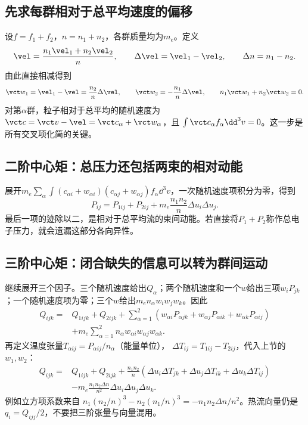 \subsection{先求每群相对于总平均速度的偏移}
设$f=f_1+f_2$，$n=n_1+n_2$，各群质量均为$m_e$。定义
\begin{equation}
 \vel=\frac{n_1\vel_1+n_2\vel_2}{n},\qquad
 \Delta\vel=\vel_1-\vel_2,\qquad \Delta n=n_1-n_2.
\end{equation}
由此直接相减得到
\begin{equation}
 \vct w_1=\vel_1-\vel=\frac{n_2}{n}\Delta\vel,
 \qquad \vct w_2=-\frac{n_1}{n}\Delta\vel,
 \qquad n_1\vct w_1+n_2\vct w_2=0.
\end{equation}
对第$\alpha$群，粒子相对于总平均的随机速度为
$\vct c=\vct v-\vel=\vct c_\alpha+\vct w_\alpha$，且
$\int\vct c_\alpha f_\alpha\dd^3v=0$。这一步是所有交叉项化简的关键。

\subsection{二阶中心矩：总压力还包括两束的相对动能}
展开$m_e\sum_\alpha\int(c_{\alpha i}+w_{\alpha i})
(c_{\alpha j}+w_{\alpha j})f_\alpha\dd^3v$，一次随机速度项积分为零，得到
\begin{equation}
 P_{ij}=P_{1ij}+P_{2ij}
 +m_e\frac{n_1n_2}{n}\Delta u_i\Delta u_j.
 \label{eq:mixture_pressure}
\end{equation}
最后一项的迹除以二，是相对于总平均流的束间动能。若直接将$P_1+P_2$称作总电子压力，就会遗漏这部分各向异性。

\subsection{三阶中心矩：闭合缺失的信息可以转为群间运动}
继续展开三个因子。三个随机速度给出$Q_\alpha$；两个随机速度和一个$w$给出三项$w_iP_{jk}$；一个随机速度项为零；三个$w$给出$m_en_\alpha w_iw_jw_k$。因此
\begin{align}
 Q_{ijk}={}&Q_{1ijk}+Q_{2ijk}
 +\sum_{\alpha=1}^2
 \left(w_{\alpha i}P_{\alpha jk}+w_{\alpha j}P_{\alpha ik}
       +w_{\alpha k}P_{\alpha ij}\right)\nonumber\\
 &+m_e\sum_{\alpha=1}^2n_\alpha w_{\alpha i}w_{\alpha j}w_{\alpha k}.
\end{align}
再定义温度张量$T_{\alpha ij}=P_{\alpha ij}/n_\alpha$（能量单位），
$\Delta T_{ij}=T_{1ij}-T_{2ij}$，代入上节的$w_1,w_2$：
\begin{align}
 Q_{ijk}={}&Q_{1ijk}+Q_{2ijk}
 +\frac{n_1n_2}{n}
 \left(\Delta u_i\Delta T_{jk}+\Delta u_j\Delta T_{ik}
                       +\Delta u_k\Delta T_{ij}\right)\nonumber\\
 &-m_e\frac{n_1n_2\Delta n}{n^2}
       \Delta u_i\Delta u_j\Delta u_k.
 \label{eq:mixture_heat}
\end{align}
例如立方项系数来自
$n_1(n_2/n)^3-n_2(n_1/n)^3
=-n_1n_2\Delta n/n^2$。热流向量仍是$q_i=Q_{ijj}/2$，不要把三阶张量与向量混用。


